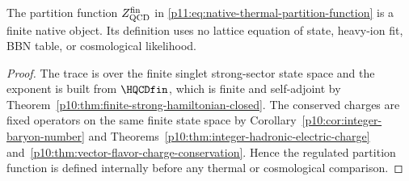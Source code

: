 \documentclass[12pt,a4paper]{article}
\begin{document}
\begin{theorem}
\label{p11:thm:finite-thermal-export-exists}
The partition function \(Z_{\rm QCD}^{\rm fin}\) in \eqref{p11:eq:native-thermal-partition-function} is a finite native object.  Its definition uses no lattice equation of state, heavy-ion fit, BBN table, or cosmological likelihood.
\end{theorem}
\begin{proof}
The trace is over the finite singlet strong-sector state space and the exponent is built from \(\HQCDfin\), which is finite and self-adjoint by Theorem~\ref{p10:thm:finite-strong-hamiltonian-closed}.  The conserved charges are fixed operators on the same finite state space by Corollary~\ref{p10:cor:integer-baryon-number} and Theorems~\ref{p10:thm:integer-hadronic-electric-charge} and~\ref{p10:thm:vector-flavor-charge-conservation}.  Hence the regulated partition function is defined internally before any thermal or cosmological comparison.\qedhere
\end{proof}
\end{document}
